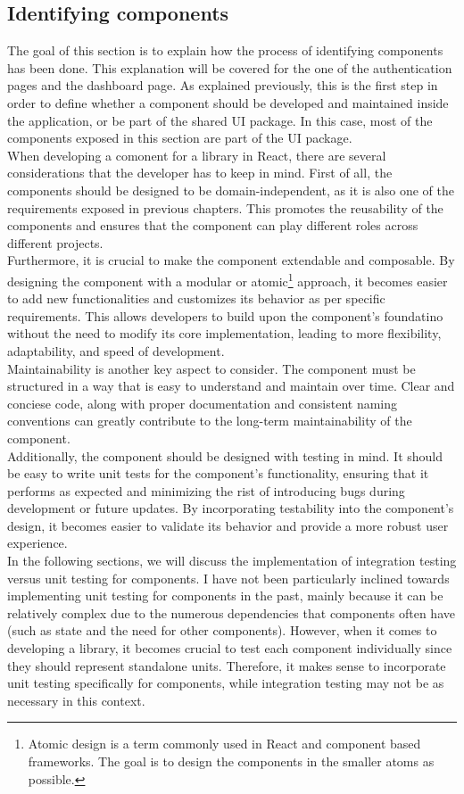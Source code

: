 \documentclass[./memory.tex]{subfiles}
\begin{document}
\subsection{Identifying components}
The goal of this section is to explain how the process of identifying components
has been done. This explanation will be covered for the one of the
authentication pages and the dashboard page. As explained previously, this is
the first step in order to define whether a component should be developed and
maintained inside the application, or be part of the shared UI package. In this
case, most of the components exposed in this section are part of the UI package.
\\[8pt]
When developing a comonent for a library in React, there are several
considerations that the developer has to keep in mind. First of all, the
components should be designed to be domain-independent, as it is also one of the
requirements exposed in previous chapters. This promotes the reusability of the
components and ensures that the component can play different roles across
different projects.
\\
Furthermore, it is crucial to make the component extendable and composable. By
designing the component with a modular or atomic\footnote{Atomic design is a
	term commonly used in React and component based frameworks. The goal is to
	design the components in the smaller atoms as possible.} approach, it becomes
easier to add new functionalities and customizes its behavior as per specific
requirements. This allows developers to build upon the component's foundatino
without the need to modify its core implementation, leading to more flexibility,
adaptability, and speed of development.
\\
Maintainability is another key aspect to consider. The component must be
structured in a way that is easy to understand and maintain over time. Clear and
conciese code, along with proper documentation and consistent naming conventions
can greatly contribute to the long-term maintainability of the component.
\\
Additionally, the component should be designed with testing in mind. It should
be easy to write unit tests for the component's functionality, ensuring that it
performs as expected and minimizing the rist of introducing bugs during
development or future updates. By incorporating testability into the component's
design, it becomes easier to validate its behavior and provide a more robust
user experience.
\\[8pt]
In the following sections, we will discuss the implementation of integration
testing versus unit testing for components. I have not been particularly
inclined towards implementing unit testing for components in the past, mainly
because it can be relatively complex due to the numerous dependencies that
components often have (such as state and the need for other components).
However, when it comes to developing a library, it becomes crucial to test each
component individually since they should represent standalone units. Therefore,
it makes sense to incorporate unit testing specifically for components, while
integration testing may not be as necessary in this context.
\end{document}
